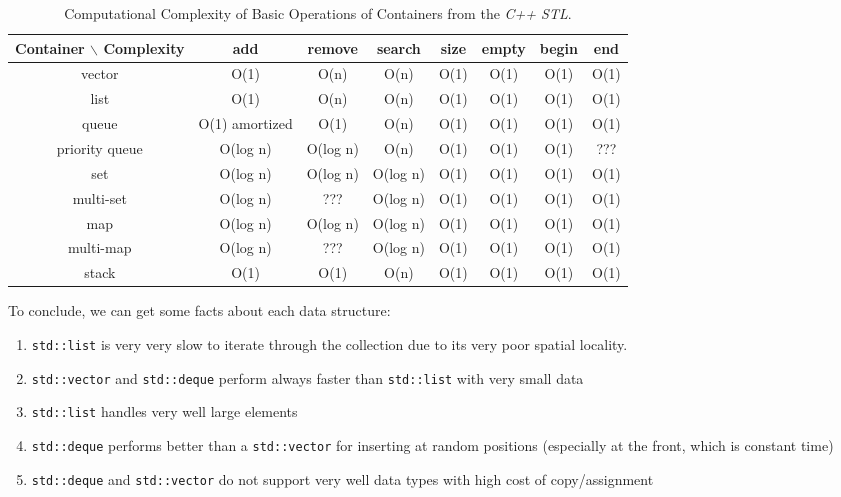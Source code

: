 \begin{table}[htp]
\caption{Computational Complexity of Basic Operations of Containers from the {\it C++ STL}.}	\vspace{-0.2in}
\label{tab:ComputationalComplexityofCppContainers}
	\begin{center}
		\begin{tabular}{|c|c|c|c|c|c|c|c|}
		\hline
		Container $\backslash$ Complexity & add & remove & search & size & empty & begin & end \\
		\hline
		vector & O(1) & O(n) & O(n) & O(1) & O(1) & O(1) & O(1) \\
		\hline
		list & O(1) & O(n) & O(n) & O(1) & O(1) & O(1) & O(1) \\
		\hline
		queue & O(1) amortized & O(1) & O(n) & O(1) & O(1) & O(1) & O(1) \\
		\hline
		priority queue & O(log n) & O(log n) & O(n) & O(1) & O(1) & O(1) & ??? \\
		\hline
		set & O(log n) & O(log n) & O(log n) & O(1) & O(1) & O(1) & O(1) \\
		\hline
		multi-set & O(log n) & ??? & O(log n) & O(1) & O(1) & O(1) & O(1) \\
		\hline
		map & O(log n) & O(log n) & O(log n) & O(1) & O(1) & O(1) & O(1) \\
		\hline
		multi-map & O(log n) & ??? & O(log n) & O(1) & O(1) & O(1) & O(1) \\
		\hline
		stack & O(1) & O(1) & O(n) & O(1) & O(1) & O(1) & O(1) \\
		\hline
		\end{tabular}
	\end{center}
\end{table}


To conclude, we can get some facts about each data structure: \vspace{-0.3cm}
\begin{enumerate} \itemsep -4pt
\item {\tt std::list} is very very slow to iterate through the collection due to its very poor spatial locality.
\item {\tt std::vector} and {\tt std::deque} perform always faster than {\tt std::list} with very small data
\item {\tt std::list} handles very well large elements
\item {\tt std::deque} performs better than a {\tt std::vector} for inserting at random positions (especially at the front, which is constant time)
\item {\tt std::deque} and {\tt std::vector} do not support very well data types with high cost of copy/assignment
\end{enumerate}



